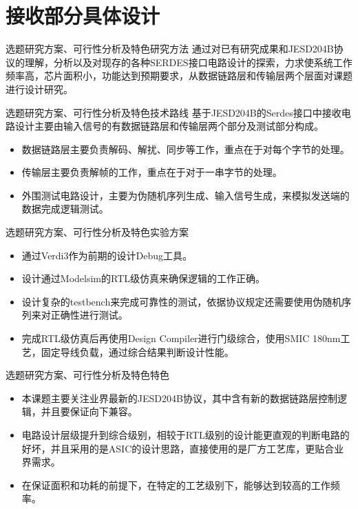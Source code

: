 \documentclass{beamer}
\begin{document}
\section{接收部分具体设计}

\begin{frame}{选题研究方案、可行性分析及特色}{研究方法}
通过对已有研究成果和JESD204B协议的理解，分析以及对现存的各种SERDES接口电路设计的探索，力求使系统工作频率高，芯片面积小，功能达到预期要求，从数据链路层和传输层两个层面对课题进行设计研究。
\end{frame}

\begin{frame}{选题研究方案、可行性分析及特色}{技术路线}
基于JESD204B的Serdes接口中接收电路设计主要由输入信号的有数据链路层和传输层两个部分及测试部分构成。
	\begin{itemize}
	\item 数据链路层主要负责解码、解扰、同步等工作，重点在于对每个字节的处理。
	\item 传输层主要负责解帧的工作，重点在于对于一串字节的处理。
	\item 外围测试电路设计，主要为伪随机序列生成、输入信号生成，来模拟发送端的数据完成逻辑测试。
	\end{itemize}
\end{frame}

\begin{frame}{选题研究方案、可行性分析及特色}{实验方案}
	\begin{itemize}
	\item 通过Verdi3作为前期的设计Debug工具。
	\item 设计通过Modelsim的RTL级仿真来确保逻辑的工作正确。
	\item 设计复杂的testbench来完成可靠性的测试，依据协议规定还需要使用伪随机序列来对正确性进行测试。
	\item 完成RTL级仿真后再使用Design Compiler进行门级综合，使用SMIC 180nm工艺，固定导线负载，通过综合结果判断设计性能。
	\end{itemize}
\end{frame}

\begin{frame}{选题研究方案、可行性分析及特色}{特色}
	\begin{itemize}
	\item 本课题主要关注业界最新的JESD204B协议，其中含有新的数据链路层控制逻辑，并且要保证向下兼容。
	\item 电路设计层级提升到综合级别，相较于RTL级别的设计能更直观的判断电路的好坏，并且采用的是ASIC的设计思路，直接使用的是厂方工艺库，更贴合业界需求。
	\item 在保证面积和功耗的前提下，在特定的工艺级别下，能够达到较高的工作频率。
	\end{itemize}
\end{frame}
\end{document}
